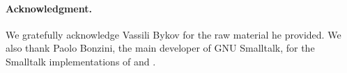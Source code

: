 \documentclass[a4paper,10pt,twoside]{book}
\begin{document}
\paragraph{Acknowledgment.}  We gratefully acknowledge Vassili Bykov for the raw material he provided. We also thank Paolo Bonzini, the main developer of GNU Smalltalk, for the Smalltalk implementations of  and .

\ifx\wholebook\relax\else
   
   
\end{document}
